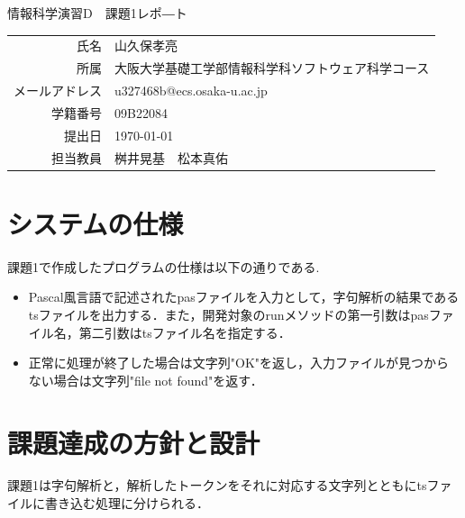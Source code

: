 \documentclass[dvipdfmx]{jarticle}
\begin{document}
\begin{titlepage}
    \begin{center}
        {\huge 情報科学演習D　課題1レポ―ト}
        \vspace{180pt}\\
        \begin{tabular}{rl}
            氏名 & 山久保孝亮\\
            所属 & 大阪大学基礎工学部情報科学科ソフトウェア科学コース\\
            メールアドレス & u327468b@ecs.osaka-u.ac.jp\\
            学籍番号 & 09B22084\\
            提出日 & \today\\
            担当教員 & 桝井晃基　松本真佑
        \end{tabular}
    \end{center}
\end{titlepage}
\section{システムの仕様}
課題1で作成したプログラムの仕様は以下の通りである.
\begin{itemize}
    \item Pascal風言語で記述されたpasファイルを入力として，字句解析の結果であるtsファイルを出力する．また，開発対象のrunメソッドの第一引数はpasファイル名，第二引数はtsファイル名を指定する．
    \item  正常に処理が終了した場合は文字列"OK"を返し，入力ファイルが見つからない場合は文字列"file not found"を返す．
\end{itemize}
\section{課題達成の方針と設計}
課題1は字句解析と，解析したトークンをそれに対応する文字列とともにtsファイルに書き込む処理に分けられる．
\end{document}
